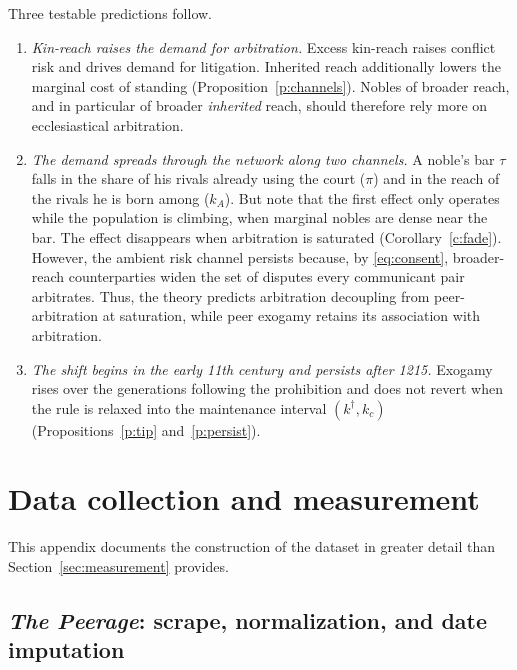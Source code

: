 \documentclass[12pt]{article}
\theoremstyle{definition}
\theoremstyle{remark}
\begin{document}
Three testable predictions follow.

\begin{enumerate}
\item \emph{Kin-reach raises the demand for arbitration.} Excess kin-reach raises conflict risk and drives demand for litigation. Inherited reach additionally lowers the marginal cost of standing (Proposition~\ref{p:channels}). Nobles of broader reach, and in particular of broader \emph{inherited} reach, should therefore rely more on ecclesiastical arbitration.
\item \emph{The demand spreads through the network along two channels.} A noble's bar $\tau$ falls in the share of his rivals already using the court ($\pi$) and in the reach of the rivals he is born among ($k_A$). But note that the first effect only operates while the population is climbing, when marginal nobles are dense near the bar. The effect disappears when arbitration is saturated (Corollary~\ref{c:fade}). However, the ambient risk channel persists because, by \eqref{eq:consent}, broader-reach counterparties widen the set of disputes every communicant pair arbitrates. Thus, the theory predicts arbitration decoupling from peer-arbitration at saturation, while peer exogamy retains its association with arbitration.
\item \emph{The shift begins in the early 11th century and persists after 1215.} Exogamy rises over the generations following the prohibition and does not revert when the rule is relaxed into the maintenance interval $(k^\dagger,k_c)$ (Propositions~\ref{p:tip} and~\ref{p:persist}).
\end{enumerate}




\section{Data collection and measurement}
\label{app:data}

This appendix documents the construction of the dataset in greater detail than Section~\ref{sec:measurement} provides.

\subsection{\textit{The Peerage}: scrape, normalization, and date imputation}
\label{app:data-peerage}
\end{document}
